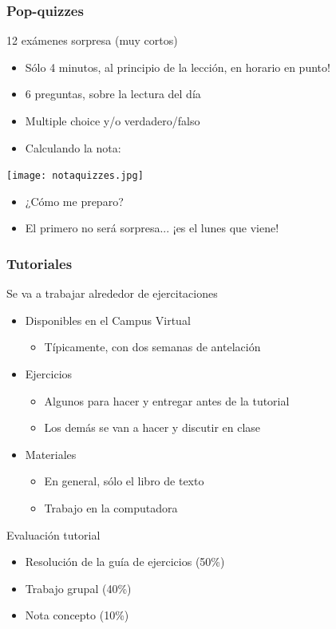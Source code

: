 \documentclass[14pt]{beamer}
\begin{document}
\begin{frame}
\frametitle{Pop-quizzes}
12 exámenes sorpresa (muy cortos) \vspace{2mm}
\begin{itemize}
    \item Sólo 4 minutos, al principio de la lección, en horario en punto!
    \item 6 preguntas, sobre la lectura del día
    \item Multiple choice y/o verdadero/falso
    \item Calculando la nota:
\end{itemize}
    \vspace{2mm}
\texttt{[image: notaquizzes.jpg]}
\begin{itemize}
    \item ¿Cómo me preparo?
    \item El primero no será sorpresa... ¡es el lunes que viene!
\end{itemize}
\end{frame}

\begin{frame}
\frametitle{Tutoriales}
Se va a trabajar alrededor de ejercitaciones \begin{itemize}
    \item Disponibles en el Campus Virtual
    \begin{itemize}
            \item Típicamente, con dos semanas de antelación
        \end{itemize}
    \item Ejercicios
        \begin{itemize}
            \item Algunos para hacer y entregar antes de la tutorial
            \item Los demás se van a hacer y discutir en clase
        \end{itemize}
    \item Materiales
        \begin{itemize}
            \item En general, sólo el libro de texto
            \item Trabajo en la computadora
        \end{itemize}
\end{itemize} 
    \vspace{2mm}
Evaluación tutorial 
\begin{itemize} 
        \item Resolución de la guía de ejercicios (50\%)
        \item Trabajo grupal (40\%)
        \item Nota concepto (10\%)
    \end{itemize}   
\end{frame}
\end{document}
